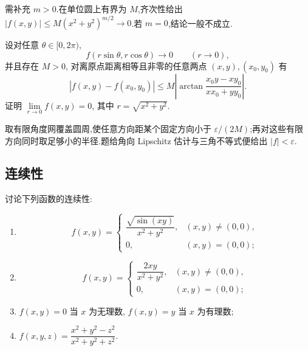 \begin{solution}
    需补充 $m>0$.在单位圆上有界为 $M$,齐次性给出 $|f(x,y)|\leq M(x^2+y^2)^{m/2}\to0$.若 $m=0$,结论一般不成立.
\end{solution}

\begin{example}
    设对任意 $\theta\in\lbrack0,2\pi)$,
    \[
        f(r\sin\theta,r\cos\theta)\to0\qquad(r\to0),
    \]
    并且存在 $M>0$, 对离原点距离相等且非零的任意两点 $(x,y),(x_0,y_0)$ 有
    \[
        |f(x,y)-f(x_0,y_0)|
        \leq M\left|\arctan\dfrac{x_0y-xy_0}{xx_0+yy_0}\right|.
    \]
    证明 $\displaystyle\lim\limits_{r\to0}f(x,y)=0$, 其中 $r=\sqrt{x^2+y^2}$.
\end{example}
\exampleblank

\begin{solution}
    取有限角度网覆盖圆周,使任意方向距某个固定方向小于 $\varepsilon/(2M)$;再对这些有限方向同时取足够小的半径.题给角向 Lipschitz 估计与三角不等式便给出 $|f|<\varepsilon$.
\end{solution}



\subsection{连续性}

\begin{example}
    讨论下列函数的连续性:
    \begin{enumerate}
        \item
              \[
                  f(x,y)=
                  \begin{cases}
                      \dfrac{\sqrt{\sin(xy)}}{x^2+y^2}, & (x,y)\ne(0,0), \\
                      0,                                & (x,y)=(0,0);
                  \end{cases}
              \]
        \item
              \[
                  f(x,y)=
                  \begin{cases}
                      \dfrac{2xy}{x^2+y^2}, & (x,y)\ne(0,0), \\
                      0,                    & (x,y)=(0,0);
                  \end{cases}
              \]
        \item $f(x,y)=0$ 当 $x$ 为无理数, $f(x,y)=y$ 当 $x$ 为有理数;
        \item $\displaystyle f(x,y,z)=\dfrac{x^2+y^2-z^2}{x^2+y^2+z^2}$.
    \end{enumerate}
\end{example}
\exampleblank

